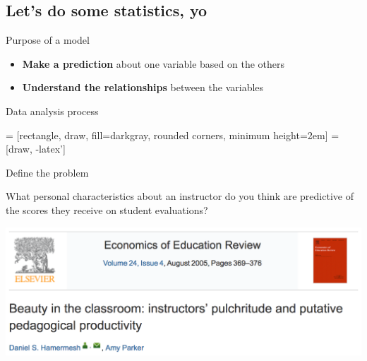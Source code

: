 \documentclass{beamer}\usepackage[]{graphicx}\usepackage[]{color}
\begin{document}
\begin{darkframes}
    \section{Let's do some statistics, yo}

    \begin{frame}{Purpose of a model}
      \begin{itemize}
        \item \textbf{Make a prediction} about one variable based on the others
        \item \textbf{Understand the relationships} between the variables
      \end{itemize}
    \end{frame}

    \begin{frame}{Data analysis process}
      \begin{center}
         = [rectangle, draw, fill=darkgray,
            rounded corners, minimum height=2em]
         = [draw, -latex']

      \end{center}
    \end{frame}

    \begin{frame}{Define the problem}
      \begin{center}
        What personal characteristics about an instructor do you think are predictive of the scores they receive on student evaluations?
      \end{center}
    \end{frame}

    \begin{frame}
      \includegraphics[width=\textwidth]{hamermesh}
    \end{frame}


\end{darkframes}
\end{document}
